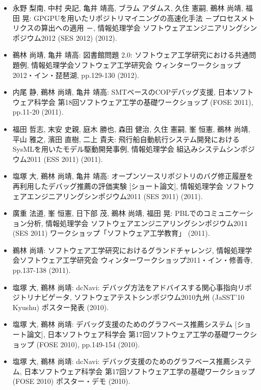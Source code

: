 \documentclass{jarticle}
\begin{document}
\begin{itemize}
\item 永野 梨南, 中村 央記, 亀井 靖高, ブラム アダムス, 久住 憲嗣, 鵜林 尚靖, 福田 晃:
GPGPUを用いたリポジトリマイニングの高速化手法 －プロセスメトリクスの算出への適用 －,
情報処理学会 ソフトウェアエンジニアリングシンポジウム2012 (SES 2012) (2012).

\item 鵜林 尚靖, 亀井 靖高:
図書館問題 2.0: ソフトウェア工学研究における共通問題例,
情報処理学会ソフトウェア工学研究会 ウィンターワークショップ2012・イン・琵琶湖, pp.129-130 (2012).

\item 内尾 静, 鵜林 尚靖, 亀井 靖高:
SMTベースのCOPデバッグ支援,
日本ソフトウェア科学会 第18回ソフトウェア工学の基礎ワークショップ (FOSE 2011), pp.11-20 (2011).

\item 福田 哲志, 末安 史親, 庭木 勝也, 森田 健治, 久住 憲嗣, 峯 恒憲, 鵜林 尚靖, 平山 雅之, 濱田 直樹, 二上 貴夫:
飛行船自動航行システム開発におけるSysMLを用いたモデル駆動開発事例,
情報処理学会 組込みシステムシンポジウム2011 (ESS 2011) (2011).

\item 塩塚 大, 鵜林 尚靖, 亀井 靖高:
オープンソースリポジトリのバグ修正履歴を再利用したデバッグ推薦の評価実験 [ショート論文],
情報処理学会 ソフトウェアエンジニアリングシンポジウム2011 (SES 2011) (2011).

\item 廣重 法道, 峯 恒憲, 日下部 茂, 鵜林 尚靖, 福田 晃:
PBLでのコミュニケーション分析,
情報処理学会 ソフトウェアエンジニアリングシンポジウム2011 (SES 2011) ワークショップ「ソフトウェア工学教育」 (2011).

\item 鵜林 尚靖:
ソフトウェア工学研究におけるグランドチャレンジ,
情報処理学会ソフトウェア工学研究会 ウィンターワークショップ2011・イン・修善寺, pp.137-138 (2011).

\item 塩塚 大, 鵜林 尚靖:
dcNavi: デバッグ方法をアドバイスする関心事指向リポジトリナビゲータ,
ソフトウェアテストシンポジウム2010九州 (JaSST'10 Kyushu) ポスター発表 (2010).

\item 塩塚 大, 鵜林 尚靖:
デバッグ支援のためのグラフベース推薦システム [ショート論文],
日本ソフトウェア科学会 第17回ソフトウェア工学の基礎ワークショップ (FOSE 2010), pp.149-154 (2010).

\item 塩塚 大, 鵜林 尚靖:
dcNavi: デバッグ支援のためのグラフベース推薦システム,
日本ソフトウェア科学会 第17回ソフトウェア工学の基礎ワークショップ (FOSE 2010) ポスター・デモ (2010).


\end{itemize}
\end{document}
